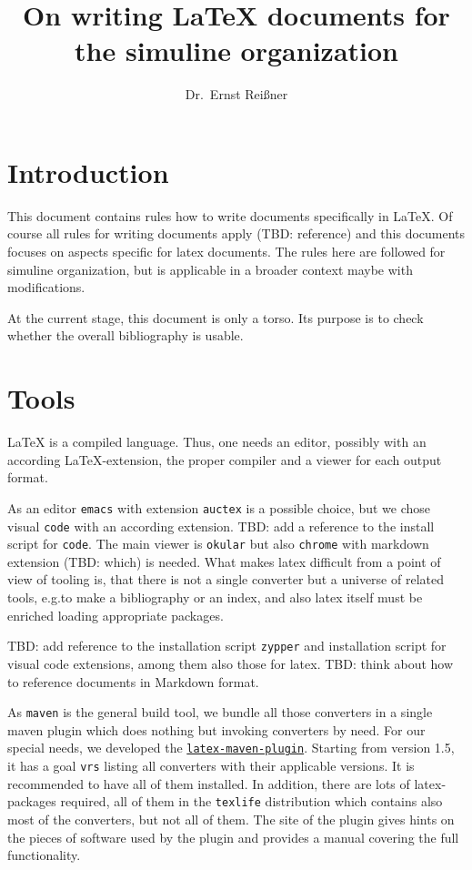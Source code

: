 \documentclass[a4paper,12pt]{article}
\begin{document}
\title{On writing \LaTeX{} documents for the simuline organization}
\author{Dr.~Ernst Reißner}
\maketitle


\newpage

\tableofcontents %
\listoffigures
\listoftables

\section{Introduction}

This document contains rules how to write documents specifically in \LaTeX. 
Of course all rules for writing documents apply (TBD\@: reference) 
and this documents focuses on aspects specific for latex documents. 
The rules here are followed for simuline organization, 
but is applicable in a broader context maybe with modifications. 

At the current stage, this document is only a torso. 
Its purpose is to check whether the overall bibliography is usable. 


\section{Tools}\label{sec:tools}

\LaTeX{} is a compiled language. 
Thus, one needs an editor, possibly with an according \LaTeX-extension, 
the proper compiler and a viewer for each output format. 

As an editor \texttt{emacs} with extension \texttt{auctex} 
is a possible choice, but we chose visual \texttt{code} with an according extension. 
TBD\@: add a reference to the install script for \texttt{code}. 
The main viewer is \texttt{okular} but also \texttt{chrome} with markdown extension (TBD\@: which) 
is needed. 
What makes latex difficult from a point of view of tooling is, 
that there is not a single converter but a universe of related tools, 
e.g.\@ to make a bibliography or an index, 
and also latex itself must be enriched loading appropriate packages. 

TBD\@: add reference to the installation script \texttt{zypper} 
and installation script for visual code extensions, among them also those for latex. 
TBD\@: think about how to reference documents in Markdown format. 


As \texttt{maven} is the general build tool, we bundle all those converters 
in a single maven plugin which does nothing but invoking converters by need. 
For our special needs, we developed the 
\href{https://github.com/Reissner/latex-maven-plugin}{\texttt{latex-maven-plugin}}. 
Starting from version 1.5, it has a goal \texttt{vrs} listing all converters 
with their applicable versions. 
It is recommended to have all of them installed. 
In addition, there are lots of latex-packages required, 
all of them in the \texttt{texlife} distribution 
which contains also most of the converters, but not all of them. 
The site of the plugin gives hints on the pieces of software used by the plugin 
and provides a manual covering the full functionality. 
\end{document}
